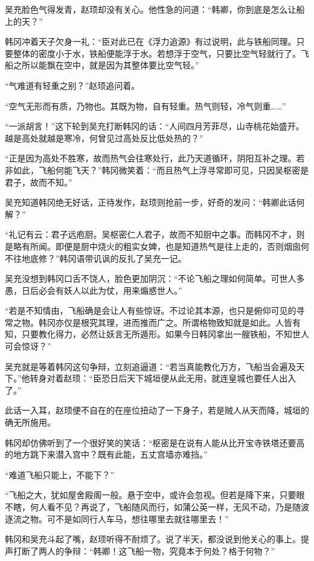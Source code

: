 吴充脸色气得发青，赵顼却没有关心。他性急的问道：“韩卿，你到底是怎么让船上的天？”

韩冈冲着天子欠身一礼：“臣对此已在《浮力追源》有过说明，此与铁船同理。只要整体的密度小于水，铁船便能浮于水。若想浮于空气，只要比空气轻就行了。飞船之所以能飘在空中，就是因为其整体要比空气轻。”

“气难道有轻重之别？”赵顼追问着。

“空气无形而有质，乃物也。其既为物，自有轻重。热气则轻，冷气则重……”

“一派胡言！”这下轮到吴充打断韩冈的话：“人间四月芳菲尽，山寺桃花始盛开。越是高处就越是寒冷，何曾见过高处反比低处热的？”

“正是因为高处不胜寒，故而热气会往寒处行，此乃天道循环，阴阳互补之理。若非如此，飞船何能飞天？”韩冈微笑着：“而且热气上浮寻常即可见，只因吴枢密是君子，故而不知。”

吴充知道韩冈绝无好话，正待发作，赵顼则抢前一步，好奇的发问：“韩卿此话何解？”

“礼记有云：君子远庖厨。吴枢密仁人君子，故而不知厨中之事。而韩冈不才，则是略有所闻。即便是厨中烧火的粗实女婢，也是知道热气是往上走的，否则烟囱何不往地底修？”韩冈语带讥讽的反扎了吴充一记。

吴充没想到韩冈口舌不饶人，脸色更加阴沉：“不论飞船之理如何简单。可世人多愚，日后必会有妖人以此为仗，用来煽惑世人。”

“若是不知情由，飞船确是会让人有些惊讶。不过论其本源，也只是俯仰可见的寻常之物。韩冈亦仅是根究其理，进而推而广之。所谓格物致知就是如此。人皆有知，只要教化得力，必然让妖言无所遁形。如果今日韩冈拿出一艘铁船，不知世人可会惊讶？”

吴充就是等着韩冈这句争辩，立刻追逼道：“若当真能教化万方，飞船当会遍及天下。”他转身对着赵顼：“臣恐日后天下城垣便从此无用，就连皇城也要任人出入了。”

此话一入耳，赵顼便不自在的在座位扭动了一下身子，若是贼人从天而降，城垣的确无所施用。

韩冈却仿佛听到了一个很好笑的笑话：“枢密是在说有人能从比开宝寺铁塔还要高的地方跳下来潜入宫中？既有此能，五丈宫墙亦难挡。”

“难道飞船只能上，不能下？”

“飞船之大，犹如屋舍殿阁一般。悬于空中，或许会忽视。但若是降下来，只要眼不瞎，何人看不见？再说了，飞船随风而行，如蒲公英一样，无风不动，乃是随波逐流之物。可不是如同行人车马，想往哪里去就往哪里去！”

韩冈和吴充斗起了嘴，赵顼听得不耐烦了。说了半天，都没说到他关心的事上。提声打断了两人的争辩：“韩卿！这飞船一物，究竟本于何处？格于何物？”

